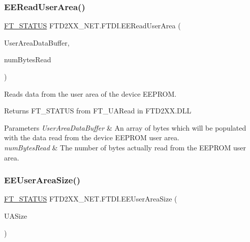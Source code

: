 \subsubsection{\texorpdfstring{EEReadUserArea()}{EEReadUserArea()}}
{\footnotesize\ttfamily \mbox{\hyperlink{class_f_t_d2_x_x___n_e_t_1_1_f_t_d_i_aabe20ad905cc4ccc1e35dd5b877d9a83}{F\+T\+\_\+\+S\+T\+A\+T\+US}} F\+T\+D2\+X\+X\+\_\+\+N\+E\+T.\+F\+T\+D\+I.\+E\+E\+Read\+User\+Area (\begin{DoxyParamCaption}\item[{byte \mbox{[}$\,$\mbox{]}}]{User\+Area\+Data\+Buffer,  }\item[{ref U\+Int32}]{num\+Bytes\+Read }\end{DoxyParamCaption})}



Reads data from the user area of the device E\+E\+P\+R\+OM. 

\begin{DoxyReturn}{Returns}
F\+T\+\_\+\+S\+T\+A\+T\+US from F\+T\+\_\+\+U\+A\+Read in F\+T\+D2\+X\+X.\+D\+LL
\end{DoxyReturn}

\begin{DoxyParams}{Parameters}
{\em User\+Area\+Data\+Buffer} & An array of bytes which will be populated with the data read from the device E\+E\+P\+R\+OM user area.\\
\hline
{\em num\+Bytes\+Read} & The number of bytes actually read from the E\+E\+P\+R\+OM user area.\\
\hline
\end{DoxyParams}
\mbox{\label{class_f_t_d2_x_x___n_e_t_1_1_f_t_d_i_a024726d9c80da5c26a1cb6c93791e0d2}} 
\subsubsection{\texorpdfstring{EEUserAreaSize()}{EEUserAreaSize()}}
{\footnotesize\ttfamily \mbox{\hyperlink{class_f_t_d2_x_x___n_e_t_1_1_f_t_d_i_aabe20ad905cc4ccc1e35dd5b877d9a83}{F\+T\+\_\+\+S\+T\+A\+T\+US}} F\+T\+D2\+X\+X\+\_\+\+N\+E\+T.\+F\+T\+D\+I.\+E\+E\+User\+Area\+Size (\begin{DoxyParamCaption}\item[{ref U\+Int32}]{U\+A\+Size }\end{DoxyParamCaption})}



